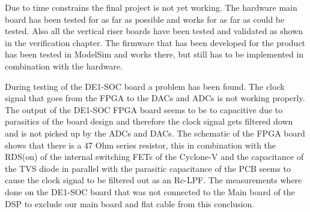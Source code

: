 Due to time constrains the final project is not yet working. The hardware main board has been tested for as far as possible and works for as far as could be tested. Also all the vertical riser boards have been tested and validated as shown in the verification chapter. The firmware that has been developed for the product has been tested in ModelSim and works there, but still has to be implemented in combination with the hardware. 
\par
\noindent During testing of the DE1-SOC board a problem has been found. The clock signal that goes from the FPGA to the DACs and ADCs is not working properly. The output of the DE1-SOC FPGA board seems to be to capacitive due to parasitics of the board design and therefore the clock signal gets filtered down and is not picked up by the ADCs and DACs. The schematic of the FPGA board shows that there is a 47 Ohm series resistor, this in combination with the RDS(on) of the internal switching FETs of the Cyclone-V and the capacitance of the TVS diode in parallel with the parasitic capacitance of the PCB seems to cause the clock signal to be filtered out as an Rc-LPF. The measurements where done on the DE1-SOC board that was not connected to the Main board of the DSP to exclude our main board and flat cable from this conclusion.